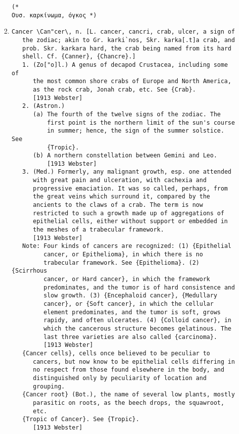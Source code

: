 \documentclass{article}
\begin{document}
\begin{itemize}
\begin{enumerate}
{\begin{lstlisting}
(* 
Ουσ. καρκίνωμα, όγκος *)
\end{lstlisting}}
\item{
\begin{lstlisting}
Cancer \Can"cer\, n. [L. cancer, cancri, crab, ulcer, a sign of
   the zodiac; akin to Gr. karki`nos, Skr. karka[.t]a crab, and
   prob. Skr. karkara hard, the crab being named from its hard
   shell. Cf. {Canner}, {Chancre}.]
   1. (Zo["o]l.) A genus of decapod Crustacea, including some of
      the most common shore crabs of Europe and North America,
      as the rock crab, Jonah crab, etc. See {Crab}.
      [1913 Webster]
   2. (Astron.)
      (a) The fourth of the twelve signs of the zodiac. The
          first point is the northern limit of the sun's course
          in summer; hence, the sign of the summer solstice. See
          {Tropic}.
      (b) A northern constellation between Gemini and Leo.
          [1913 Webster]
   3. (Med.) Formerly, any malignant growth, esp. one attended
      with great pain and ulceration, with cachexia and
      progressive emaciation. It was so called, perhaps, from
      the great veins which surround it, compared by the
      ancients to the claws of a crab. The term is now
      restricted to such a growth made up of aggregations of
      epithelial cells, either without support or embedded in
      the meshes of a trabecular framework.
      [1913 Webster]
   Note: Four kinds of cancers are recognized: (1) {Epithelial
         cancer, or Epithelioma}, in which there is no
         trabecular framework. See {Epithelioma}. (2) {Scirrhous
         cancer, or Hard cancer}, in which the framework
         predominates, and the tumor is of hard consistence and
         slow growth. (3) {Encephaloid cancer}, {Medullary
         cancer}, or {Soft cancer}, in which the cellular
         element predominates, and the tumor is soft, grows
         rapidy, and often ulcerates. (4) {Colloid cancer}, in
         which the cancerous structure becomes gelatinous. The
         last three varieties are also called {carcinoma}.
         [1913 Webster]
   {Cancer cells}, cells once believed to be peculiar to
      cancers, but now know to be epithelial cells differing in
      no respect from those found elsewhere in the body, and
      distinguished only by peculiarity of location and
      grouping.
   {Cancer root} (Bot.), the name of several low plants, mostly
      parasitic on roots, as the beech drops, the squawroot,
      etc.
   {Tropic of Cancer}. See {Tropic}.
      [1913 Webster]

\end{lstlisting}}
\end{enumerate}
\end{itemize}
\end{document}
